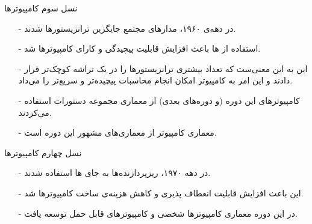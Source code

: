 \begin{frame}{نسل سوم کامپیوتر‌ها}
\begin{itemize}\itemr
\item[-]
در دهه‌ی ۱۹۶۰، مدار‌های مجتمع 
جایگزین ترانزیستور‌ها شدند.
\item[-]
استفاده از ها باعث افزایش قابلیت پیچیدگی و کارای کامپیوتر‌ها شد.
\item[-]
این به این معنی‌ست که تعداد بیشتری ترانزیستور‌ها را در یک تراشه کوچک‌تر قرار دادند و این امر به کامپیوتر امکان انجام محاسبات پیچیده‌تر و سریع‌تر را می‌داد.
\item[-]
کامپیوتر‌های این دوره (و دوره‌‌های بعدی) از معماری مجموعه دستورات 
استفاده می‌کردند.
\item[-]
معماری کامپیوتر 
از معماری‌های مشهور این دوره است.
\end{itemize}
\end{frame}

\begin{frame}{نسل چهارم کامپیوتر‌‌ها}
\begin{itemize}\itemr
\item[-]
در دهه‌ ۱۹۷۰، ریزپردازنده‌‌ها به جای 
ها
استفاده شدند. 
\item[-]
این باعث افزایش قابلیت انعطاف پذیری و کاهش هزینه‌ی ساخت کامپیوتر‌ها شد.
\item[-]
در این دوره معماری کامپیوتر‌ها شخصی و کامپیوتر‌های قابل حمل توسعه یافت.
\end{itemize}
\end{frame}
